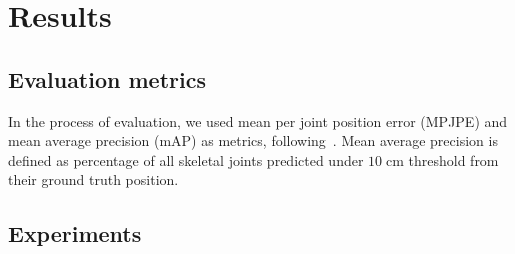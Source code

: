 \chapter{Results}\label{chap:results}


\section{Evaluation metrics}
In the process of evaluation, we used mean per joint position error (MPJPE) and mean average precision (mAP) as metrics, following~\cite{Ali19,haque2016viewpoint,Marin18jvcir,Shafaei16}. Mean average precision is defined as percentage of all skeletal joints predicted under $10 \; \mbox{cm}$ threshold from their ground truth position.

\section{Experiments}



